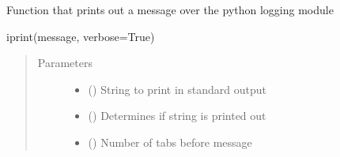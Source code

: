 \documentclass[letterpaper,10pt,english,openany,oneside]{sphinxmanual}
\begin{document}
\begin{fulllineitems}
\label{\detokenize{pygpc:pygpc.io.iprint}}
Function that prints out a message over the python logging module

iprint(message, verbose=True)
\begin{quote}\begin{description}
\item[{Parameters}] \leavevmode\begin{itemize}
\item {} 
 () \textendash{} String to print in standard output

\item {} 
 (\sphinxstyleliteralemphasis{\sphinxupquote{, }}\sphinxstyleliteralemphasis{\sphinxupquote{, }}) \textendash{} Determines if string is printed out

\item {} 
 () \textendash{} Number of tabs before message

\end{itemize}

\end{description}\end{quote}

\end{fulllineitems}

\end{document}
